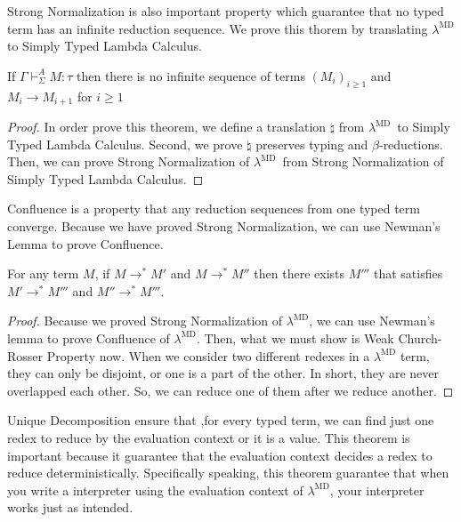 \documentclass[runningheads]{llncs}
\newcommand{\LMD}{$\lambda^{\textrm{MD}}$\xspace}
\newcommand{\G}{\Gamma}
\newcommand{\V}{\vdash_\Sigma}
\begin{document}
									
									Strong Normalization is also important property which guarantee that
									no typed term has an infinite reduction sequence.
									We prove this thorem by translating \LMD to Simply Typed Lambda Calculus.
									
									\begin{theorem}
										If $\G\V^A M:\tau$ then there is no infinite sequence of terms $(M_i)_{i\ge1}$ and 
										$M_i \longrightarrow M_{i+1}$ for $i\ge 1$
									\end{theorem}
									
									\begin{proof}
										In order prove this theorem, we define a translation $\natural$ from \LMD\ to Simply Typed Lambda Calculus.
										Second, we prove $\natural$ preserves typing and $\beta$-reductions.
										Then, we can prove Strong Normalization of \LMD\ from Strong Normalization of Simply Typed Lambda Calculus.
									\end{proof}
									
									Confluence is a property that any reduction sequences from one typed term converge.
									Because we have proved Strong Normalization, we can use Newman's Lemma to prove Confluence.
									
									\begin{theorem}[Confluence]
										For any term $M$, if $M \longrightarrow^* M'$ and $M \longrightarrow^* M''$ then
										there exists $M'''$ that satisfies $M' \longrightarrow^* M'''$ and $M'' \longrightarrow^* M'''$.
									\end{theorem}
									
									\begin{proof}
										Because we proved Strong Normalization of \LMD, 
										we can use Newman's lemma to prove Confluence of \LMD.
										Then, what we must show is Weak Church-Rosser Property now.
										When we consider two different redexes in a \LMD term, they can only be disjoint, or one is a part of the other.
										In short, they are never overlapped each other.
										So, we can reduce one of them after we reduce another.
									\end{proof}
									
									Unique Decomposition ensure that
									,for every typed term, we can find just one redex to reduce by the evaluation context or it is a value.
									This theorem is important because it guarantee
									that the evaluation context decides a redex to reduce deterministically.
									Specifically speaking, this theorem guarantee that 
									when you write a interpreter using the evaluation context of \LMD,
									your interpreter works just as intended.
									
\end{document}
